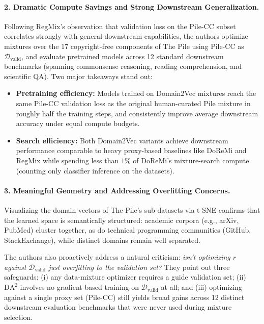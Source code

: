 \documentclass[12pt]{article}
\begin{document}
\paragraph{2. Dramatic Compute Savings and Strong Downstream Generalization.}
Following RegMix's observation that validation loss on the Pile-CC subset correlates strongly with general downstream capabilities, the authors optimize mixtures over the 17 copyright-free components of The Pile using Pile-CC as $\mathcal{D}_{\text{valid}}$, and evaluate pretrained models across 12 standard downstream benchmarks (spanning commonsense reasoning, reading comprehension, and scientific QA). Two major takeaways stand out:
\begin{itemize}
    \item \textbf{Pretraining efficiency:} Models trained on Domain2Vec mixtures reach the same Pile-CC validation loss as the original human-curated Pile mixture in roughly half the training steps, and consistently improve average downstream accuracy under equal compute budgets.
    \item \textbf{Search efficiency:} Both Domain2Vec variants achieve downstream performance comparable to heavy proxy-based baselines like DoReMi and RegMix while spending less than $1\%$ of DoReMi's mixture-search compute (counting only classifier inference on the datasets).
\end{itemize}

\paragraph{3. Meaningful Geometry and Addressing Overfitting Concerns.}
Visualizing the domain vectors of The Pile's sub-datasets via t-SNE confirms that the learned space is semantically structured: academic corpora (e.g., arXiv, PubMed) cluster together, as do technical programming communities (GitHub, StackExchange), while distinct domains remain well separated.

The authors also proactively address a natural criticism: \emph{isn't optimizing $r$ against $\mathcal{D}_{\text{valid}}$ just overfitting to the validation set?} They point out three safeguards: (i) any data-mixture optimizer requires a guide validation set; (ii) $\mathrm{DA}^2$ involves no gradient-based training on $\mathcal{D}_{\text{valid}}$ at all; and (iii) optimizing against a single proxy set (Pile-CC) still yields broad gains across 12 distinct downstream evaluation benchmarks that were never used during mixture selection.
\end{document}
